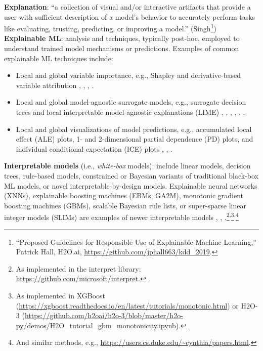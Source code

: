 \documentclass[sigconf]{acmart}
\begin{document}
\vspace{-8pt}
\noindent\textbf{Explanation}: ``a collection of visual and/or interactive artifacts that provide a user with sufficient description of a model's behavior to accurately perform tasks like evaluating, trusting, predicting, or improving a model.'' (Singh\footnote{``Proposed Guidelines for Responsible Use of Explainable Machine Learning,'' Patrick Hall, H2O.ai, \url{https://github.com/jphall663/kdd_2019}.})\\

\vspace{-8pt}
\noindent\textbf{Explainable ML}:  analysis and techniques, typically post-hoc, employed to understand trained model mechanisms or predictions. Examples of common explainable ML techniques include:
\begin{itemize}
\item Local and global variable importance, e.g., Shapley and derivative-based variable attribution \cite{grad_attr} \cite{keinan2004fair}, \cite{shapley}, \cite{shapley1988shapley}, \cite{kononenko2010efficient}.
\item Local and global model-agnostic surrogate models, e.g., surrogate decision trees and local interpretable model-agnostic explanations (LIME) \cite{dt_surrogate2}, \cite{viper}, \cite{dt_surrogate1}, \cite{lime-sup}, \cite{lime}, \cite{wf_xnn}. 
\item Local and global visualizations of model predictions, e.g., accumulated local effect (ALE) plots, 1- and 2-dimensional partial dependence (PD) plots, and individual conditional expectation (ICE) plots \cite{ale_plot}, \cite{esl}, \cite{ice_plots}.
\end{itemize}  

\noindent\textbf{Interpretable models} (i.e., \textit{white-box} models): include linear models, decision trees, rule-based models, constrained or Bayesian variants of traditional black-box ML models, or novel interpretable-by-design models. Explainable neural networks (XNNs), explainable boosting machines (EBMs, GA2M), monotonic gradient boosting machines (GBMs), scalable Bayesian rule lists, or super-sparse linear integer models (SLIMs) are examples of newer interpretable models \cite{slim}, \cite{wf_xnn}, \cite{sbrl}.\footnote{As implemented in the interpret library: \url{https://github.com/microsoft/interpret}.}\textsuperscript{,}\footnote{As implemented in XGBoost (\url{https://xgboost.readthedocs.io/en/latest/tutorials/monotonic.html}) or H2O-3 (\url{https://github.com/h2oai/h2o-3/blob/master/h2o-py/demos/H2O_tutorial_gbm_monotonicity.ipynb}).}\textsuperscript{,}\footnote{And similar methods, e.g., \url{https://users.cs.duke.edu/~cynthia/papers.html}.}\\
\end{document}
